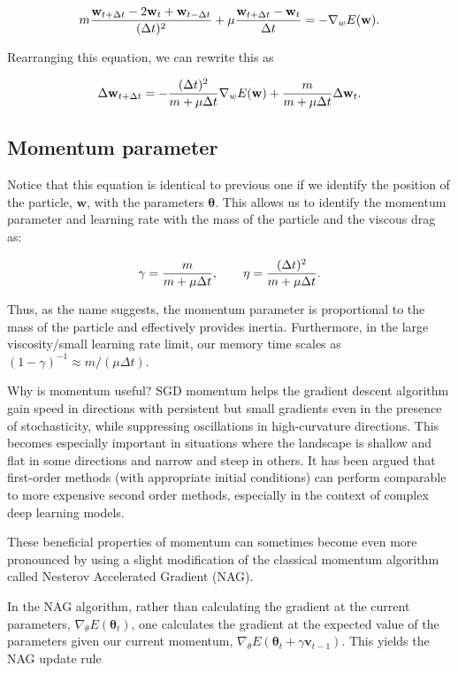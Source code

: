 \documentclass[%
oneside,                 %
final,                   %
10pt]{article}
\begin{document}
\[
m { \mathbf{w}_{t+\Delta t}-2 \mathbf{w}_{t} +\mathbf{w}_{t-\Delta t} \over (\Delta t)^2}+\mu {\mathbf{w}_{t+\Delta t}- \mathbf{w}_{t} \over \Delta t} = -\nabla_w E(\mathbf{w}).
\]

Rearranging this equation, we can rewrite this as

\[
\Delta \mathbf{w}_{t +\Delta t}= - { (\Delta t)^2 \over m +\mu \Delta t} \nabla_w E(\mathbf{w})+ {m \over m +\mu \Delta t} \Delta \mathbf{w}_t.
\]

\subsection*{Momentum parameter}

Notice that this equation is identical to previous one if we identify
the position of the particle, $\mathbf{w}$, with the parameters
$\boldsymbol{\theta}$. This allows us to identify the momentum
parameter and learning rate with the mass of the particle and the
viscous drag as:

\[
\gamma= {m \over m +\mu \Delta t }, \qquad \eta = {(\Delta t)^2 \over m +\mu \Delta t}.
\]

Thus, as the name suggests, the momentum parameter is proportional to
the mass of the particle and effectively provides inertia.
Furthermore, in the large viscosity/small learning rate limit, our
memory time scales as $(1-\gamma)^{-1} \approx m/(\mu \Delta t)$.

Why is momentum useful? SGD momentum helps the gradient descent
algorithm gain speed in directions with persistent but small gradients
even in the presence of stochasticity, while suppressing oscillations
in high-curvature directions. This becomes especially important in
situations where the landscape is shallow and flat in some directions
and narrow and steep in others. It has been argued that first-order
methods (with appropriate initial conditions) can perform comparable
to more expensive second order methods, especially in the context of
complex deep learning models.

These beneficial properties of momentum can sometimes become even more
pronounced by using a slight modification of the classical momentum
algorithm called Nesterov Accelerated Gradient (NAG).

In the NAG algorithm, rather than calculating the gradient at the
current parameters, $\nabla_\theta E(\boldsymbol{\theta}_t)$, one
calculates the gradient at the expected value of the parameters given
our current momentum, $\nabla_\theta E(\boldsymbol{\theta}_t +\gamma
\mathbf{v}_{t-1})$. This yields the NAG update rule
\end{document}
